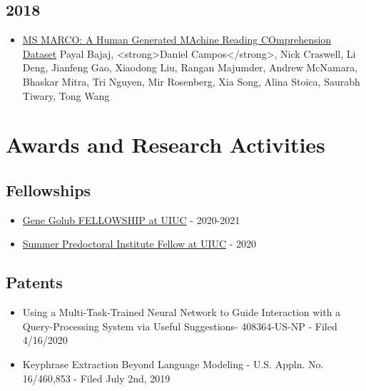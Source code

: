 \documentclass[line,margin]{res}
\begin{document}
\begin{resume}
\subsection{2018}
    \begin{itemize}
    \item \href{https://arxiv.org/abs/1611.09268}{MS MARCO: A Human Generated MAchine Reading COmprehension Dataset} Payal Bajaj, <strong>Daniel Campos</strong>, Nick Craswell, Li Deng, Jianfeng Gao, Xiaodong Liu, Rangan Majumder, Andrew McNamara, Bhaskar Mitra, Tri Nguyen, Mir Rosenberg, Xia Song, Alina Stoica, Saurabh Tiwary, Tong Wang 
    \end{itemize}
\section{Awards and Research Activities}
\subsection{Fellowships}
\begin{itemize}
\itemsep -5pt
    \item \href{https://cs.illinois.edu/about/awards/graduate-fellowships-awards/computer-science-gene-golub-fellowship}{Gene Golub FELLOWSHIP at UIUC} - 2020-2021
    \item \href{https://grad.illinois.edu/diversity/spi}{Summer Predoctoral Institute Fellow at UIUC} - 2020
\end{itemize}
\subsection{Patents}
\begin{itemize}
\itemsep -5pt
    \item Using a Multi-Task-Trained Neural Network to Guide Interaction with a Query-Processing System via Useful Suggestions- 408364-US-NP - Filed 4/16/2020
    \item Keyphrase Extraction Beyond Language Modeling - U.S. Appln. No. 16/460,853 - Filed July 2nd, 2019
\end{itemize}

\end{resume}
\end{document}
